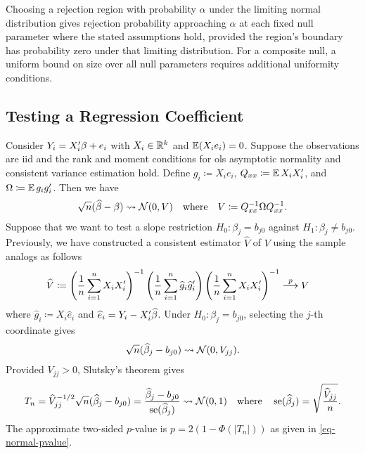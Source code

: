 \documentclass[a4paper,12pt]{article}
\begin{document}
\begin{remark}
	Choosing a rejection region with probability $\alpha$ under the limiting normal distribution
	gives rejection probability approaching $\alpha$ at each fixed null parameter where the stated assumptions hold,
	provided the region's boundary has probability zero under that limiting distribution.
	For a composite null, a uniform bound on size over all null parameters requires additional uniformity conditions.
\end{remark}

\subsection{Testing a Regression Coefficient}

Consider $Y_i=X_i^{\prime}\beta+e_i$ with $X_i\in\mathbb{R}^k$ and $\operatorname{\mathbb{E}}(X_ie_i)=0$.
Suppose the observations are \gls{iid} and the rank and moment conditions for
\gls{ols} asymptotic normality and consistent variance estimation hold.
Define $g_i\coloneqq X_i e_i$, $Q_{xx}\coloneqq\operatorname{\mathbb{E}} X_iX_i^{\prime}$, and $\Omega\coloneqq\operatorname{\mathbb{E}} g_i g_i^{\prime}$.
Then we have
\begin{align}
	\sqrt n(\widehat\beta-\beta)\overset{}{\leadsto}\operatorname{\mathcal{N}}(0,V)
	\quad\text{where}\quad
	V \coloneqq Q_{xx}^{-1}\Omega Q_{xx}^{-1}.
\end{align}
Suppose that we want to test a slope restriction $H_0:\beta_j=b_{j0}$ against $H_1:\beta_j\ne b_{j0}$.
Previously, we have constructed a consistent estimator $\widehat V$ of $V$ using the sample analogs as follows
\begin{align}
	\widehat V
	&\coloneqq
	\left(\frac1n\sum_{i=1}^{n}X_iX_i^{\prime}\right)^{-1}
	\left(\frac1n\sum_{i=1}^{n} \widehat g_i\widehat g_i^{\prime}\right)
	\left(\frac1n\sum_{i=1}^{n}X_iX_i^{\prime}\right)^{-1}
	\overset{p}{\longrightarrow}
	V
\end{align}
where $\widehat g_i\coloneqq X_i\widehat e_i$ and $\widehat e_i=Y_i-X_i^{\prime}\widehat\beta$.
Under $H_0:\beta_j=b_{j0}$, selecting the $j$-th coordinate gives
\begin{align}
	\sqrt n(\widehat\beta_j-b_{j0})\overset{}{\leadsto}\operatorname{\mathcal{N}}(0,V_{jj}).
\end{align}
Provided $V_{jj}>0$, Slutsky's theorem gives
\begin{align}
	T_n=\widehat V_{jj}^{-1/2}\sqrt{n}(\widehat\beta_j-b_{j0})
	=\frac{\widehat\beta_j-b_{j0}}{\operatorname{se}(\widehat\beta_j)}
	\overset{}{\leadsto}\operatorname{\mathcal{N}}(0,1)
	\quad\text{where}\quad
	\operatorname{se}(\widehat\beta_j)=\sqrt{\frac{\widehat V_{jj}}{n}}.
\end{align}
The approximate two-sided $p$-value is $p=2(1-\Phi(|T_n|))$ as given in \eqref{eq-normal-pvalue}.
\end{document}
